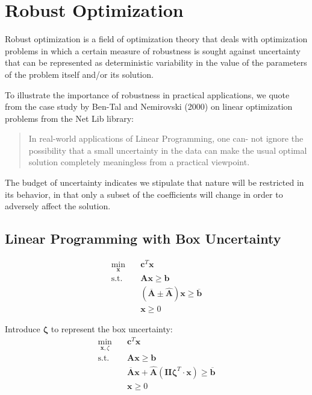 \documentclass[fleqn,10pt]{wlscirep}
\begin{document}
\section{Robust Optimization}

Robust optimization is a field of optimization theory that deals with optimization problems in which a certain measure of robustness is sought against uncertainty that can be represented as deterministic variability in the value of the parameters of the problem itself and/or its solution. \cite{wiki:xxx}

To illustrate the importance of robustness in practical applications, we quote from the case study by Ben-Tal and Nemirovski (2000) \cite{ben2000robust} on linear optimization problems from the Net Lib library:

\begin{quote}
	In real-world applications of Linear Programming, one can- not ignore the possibility that a small uncertainty in the data can make the usual optimal solution completely meaningless from a practical viewpoint.
\end{quote}

The budget of uncertainty indicates we stipulate that nature will be restricted in its behavior, in that only a subset of the coefficients will change in order to adversely affect the solution. \cite{bertsimas2004price}

\subsection{Linear Programming with Box Uncertainty}

\begin{align}
    \min_{\mathbf{x}} \quad & \mathbf{c}^T \mathbf{x} \\
    \text{s.t.} \quad & \mathbf{A} \mathbf{x} \geq \mathbf{b} \\
    & \left(\overline{\mathbf{A}} \pm \widehat{\mathbf{A}} \right) \mathbf{x} \geq \overline{\mathbf{b}} \\
    & \mathbf{x} \geq 0
\end{align}

Introduce $\boldsymbol{\zeta}$ to represent the box uncertainty:
\begin{align}
    \min_{\mathbf{x}, \zeta} \quad & \mathbf{c}^T \mathbf{x} \\
    \text{s.t.} \quad & \mathbf{A} \mathbf{x} \geq \mathbf{b} \\
    & \overline{\mathbf{A}} \mathbf{x} + \hat{\mathbf{A}} \left(\mathbf{II} \boldsymbol{\zeta}^{T} \cdot \mathbf{x} \right) \geq \overline{\mathbf{b}} \\
    & \mathbf{x} \geq 0
\end{align}
\end{document}

